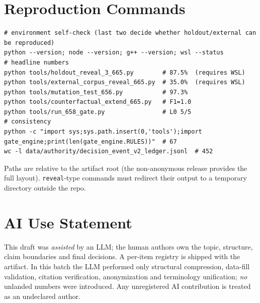 \documentclass{article}
\begin{document}
\section{Reproduction Commands}
\label{app:repro}
\begin{verbatim}
# environment self-check (last two decide whether holdout/external can be reproduced)
python --version; node --version; g++ --version; wsl --status
# headline numbers
python tools/holdout_reveal_3_665.py        # 87.5%  (requires WSL)
python tools/external_corpus_reveal_665.py  # 35.0%  (requires WSL)
python tools/mutation_test_656.py           # 97.3%
python tools/counterfactual_extend_665.py   # F1=1.0
python tools/run_658_gate.py                # L0 5/5
# consistency
python -c "import sys;sys.path.insert(0,'tools');import gate_engine;print(len(gate_engine.RULES))"  # 67
wc -l data/authority/decision_event_v2_ledger.jsonl  # 452
\end{verbatim}
Paths are relative to the artifact root (the non-anonymous release provides the full layout).
\texttt{reveal}-type commands must redirect their output to a temporary directory outside the repo.

\section{AI Use Statement}
\label{app:ai}
This draft was \emph{assisted} by an LLM; the human authors own the topic, structure, claim
boundaries and final decisions. A per-item registry is shipped with the artifact. In this batch the
LLM performed only structural compression, data-fill validation, citation verification,
anonymization and terminology unification; \emph{no} unlanded numbers were introduced. Any
unregistered AI contribution is treated as an undeclared author.
\end{document}
